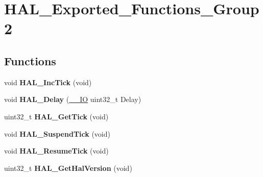 \hypertarget{group___h_a_l___exported___functions___group2}{\section{H\-A\-L\-\_\-\-Exported\-\_\-\-Functions\-\_\-\-Group2}
\label{group___h_a_l___exported___functions___group2}
}
\subsection*{Functions}
\begin{DoxyCompactItemize}
\item 
\hypertarget{group___h_a_l___exported___functions___group2_gaa8361d44d76b7f6256834f828165837a}{void {\bfseries H\-A\-L\-\_\-\-Inc\-Tick} (void)}\label{group___h_a_l___exported___functions___group2_gaa8361d44d76b7f6256834f828165837a}

\item 
\hypertarget{group___h_a_l___exported___functions___group2_gad0304dec8e33aca8c99e2836947b76d6}{void {\bfseries H\-A\-L\-\_\-\-Delay} (\hyperlink{core__sc300_8h_aec43007d9998a0a0e01faede4133d6be}{\-\_\-\-\_\-\-I\-O} uint32\-\_\-t Delay)}\label{group___h_a_l___exported___functions___group2_gad0304dec8e33aca8c99e2836947b76d6}

\item 
\hypertarget{group___h_a_l___exported___functions___group2_gaf2c4f03d53e997a54e1fd5e80daa55c4}{uint32\-\_\-t {\bfseries H\-A\-L\-\_\-\-Get\-Tick} (void)}\label{group___h_a_l___exported___functions___group2_gaf2c4f03d53e997a54e1fd5e80daa55c4}

\item 
\hypertarget{group___h_a_l___exported___functions___group2_gaaf651af2afe688a991c657f64f8fa5f9}{void {\bfseries H\-A\-L\-\_\-\-Suspend\-Tick} (void)}\label{group___h_a_l___exported___functions___group2_gaaf651af2afe688a991c657f64f8fa5f9}

\item 
\hypertarget{group___h_a_l___exported___functions___group2_ga24e0ee9dae1ec0f9d19200f5575ff790}{void {\bfseries H\-A\-L\-\_\-\-Resume\-Tick} (void)}\label{group___h_a_l___exported___functions___group2_ga24e0ee9dae1ec0f9d19200f5575ff790}

\item 
\hypertarget{group___h_a_l___exported___functions___group2_gafb139b375512ad2a234e4619b129b966}{uint32\-\_\-t {\bfseries H\-A\-L\-\_\-\-Get\-Hal\-Version} (void)}\label{group___h_a_l___exported___functions___group2_gafb139b375512ad2a234e4619b129b966}


\end{DoxyCompactItemize}
